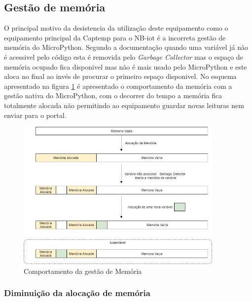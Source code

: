 \subsection {Gestão de memória}

\par O principal motivo da desistencia da utilização deste equipamento como o equipamento principal da Captemp para o NB-iot é a incorreta gestão de memória do MicroPython. Segundo a documentação quando uma variável já não é acessivel pelo código esta é removida pelo \textit{Garbage Collector} mas o espaço de memória  ocupado fica disponivel mas não é mais usado pelo MicroPython e este aloca no final ao invés de procurar o primeiro espaço disponivel. No esquema apresentado na figura \ref{memo} é apresentado o comportamento da memória com a gestão nativa do MicroPython, com o decorrer do tempo a memória fica totalmente alocada não permitindo ao equipamento guardar novas leituras nem enviar para o portal.


 \begin{figure}[ht]
\centering
\includegraphics[width=0.90\textwidth]{images/memo.png}
\caption{Comportamento da gestão de Memória}\label{memo}
\end{figure}



\subsubsection {Diminuição da alocação de memória}

